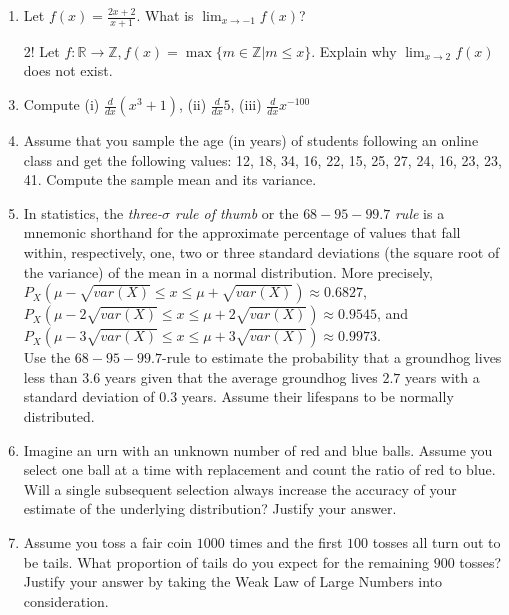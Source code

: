 \documentclass{article}
\begin{document}
\begin{enumerate}
	\item Let $f(x) = \frac{2x + 2}{x + 1}$. What is $\lim_{x \to -1} f(x)$?
	\item[2!] Let $f: \mathbb{R} \to \mathbb{Z}, f(x) = \max\{m \in \mathbb{Z} | m \leq x\}$. Explain why $\lim_{x \to 2} f(x)$ does not exist. 
	\item Compute (i) $\frac{d}{dx}(x^3 + 1)$, (ii) $\frac{d}{dx}5$, (iii) $\frac{d}{dx} x^{-100}$
	\item Assume that you sample the age (in years) of students following an online class and get the following values: 12, 18, 34, 16, 22, 15, 25, 27, 24, 16, 23, 23, 41. Compute the sample mean and its variance.
	\item In statistics, the {\em three-$\sigma$ rule of thumb} or the $68-95-99.7$ {\em rule} is a mnemonic shorthand for the approximate percentage of values that fall within, respectively, one, two or three standard deviations (the square root of the variance) of the mean in a normal distribution. More precisely, $P_X(\mu - \sqrt{var(X)} \leq x \leq \mu + \sqrt{var(X)}) \approx 0.6827$,  $P_X(\mu - 2\sqrt{var(X)} \leq x \leq \mu + 2\sqrt{var(X)}) \approx 0.9545$, and $P_X(\mu - 3\sqrt{var(X)} \leq x \leq \mu + 3\sqrt{var(X)}) \approx 0.9973$.\\ Use the $68-95-99.7$-rule to estimate the probability that a groundhog lives less than $3.6$ years given that the average groundhog lives $2.7$ years with a standard deviation of $0.3$ years. Assume their lifespans to be normally distributed.
	\item Imagine an urn with an unknown number of red and blue balls. Assume you select one ball at a time with replacement and count the ratio of red to blue. Will a single subsequent selection always increase the accuracy of your estimate of the underlying distribution? Justify your answer.  
	\item Assume you toss a fair coin $1000$ times and the first $100$ tosses all turn out to be tails. What proportion of tails do you expect for the remaining $900$ tosses? Justify your answer by taking the Weak Law of Large Numbers into consideration. 
\end{enumerate}		
\end{document}
